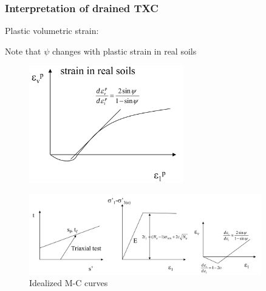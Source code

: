 \documentclass[notes]{beamer}
\begin{document}
\begin{frame}
\frametitle{Interpretation of drained TXC}
	
\noindent
\fboxsep=0pt
\noindent
\begin{minipage}[t]{0.48\linewidth}
Plastic volumetric strain:
\end{minipage}%
\hfill%
\begin{minipage}[t]{0.48\linewidth}
	Note that $\psi$ changes with plastic
	strain in real soils
	\begin{figure}
		\includegraphics[width=0.6\textwidth]{figs/mc-drained-txc.png}
	\end{figure}
\end{minipage}
\begin{figure}
	\includegraphics[width=0.9\textwidth]{figs/idealized-mc.png}
	\caption*{Idealized M-C curves}
\end{figure}
\end{frame}
\end{document}

